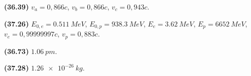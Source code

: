 \begin{tcolorbox}
\begin{enumerate*}[label = ]
  \item \textbf{(36.39)} $v_a = 0,866c$, $v_b = 0,866c$, $v_c = 0,943c$.
  \item \textbf{(37.26)} $E_{0,e} = \SI{0.511}{MeV}$, $E_{0,p} = \SI{938.3}{MeV}$, $E_e = \SI{3.62}{MeV}$, $E_p = \SI{6652}{MeV}$, $v_e = 0,99999997c$, $v_p = 0,883c$.
  \item \textbf{(36.73)} $\SI{1.06}{pm}$. \\
  \item \textbf{(37.28)} $\SI{1.26e-26}{kg}$.
\end{enumerate*}
\end{tcolorbox}

\newpage